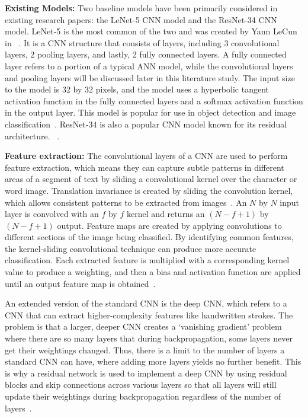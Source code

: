 \textbf{Existing Models:} Two baseline models have been primarily considered in existing research papers: the LeNet-5 CNN model and the ResNet-34 CNN model. LeNet-5 is the most common of the two and was created by Yann LeCun in ~\cite[Fig.~2]{lecun1998}. It is a CNN structure that consists of  layers, including 3 convolutional layers, 2 pooling layers, and lastly, 2 fully connected layers. A fully connected layer refers to a portion of a typical ANN model, while the convolutional layers and pooling layers will be discussed later in this literature study. The input size to the model is 32 by 32 pixels, and the model uses a hyperbolic tangent activation function in the fully connected layers and a softmax activation function in the output layer. This model is popular for use in object detection and image classification~\cite{chen2023}.
ResNet-34 is also a popular CNN model known for its residual architecture. ~\cite{ma2023}.

\textbf{Feature extraction:} The convolutional layers of a CNN are used to perform feature extraction, which means they can capture subtle patterns in different areas of a segment of text by sliding a convolutional kernel over the character or word image. Translation invariance is created by sliding the convolution kernel, which allows consistent patterns to be extracted from images~\cite{ma2023}. An $N$ by $N$ input layer is convolved with an $f$ by $f$ kernel and returns an $(N-f+1)$ by $(N-f+1)$ output. Feature maps are created by applying convolutions to different sections of the image being classified. By identifying common features, the kernel-sliding convolutional technique can produce more accurate classification. Each extracted feature is multiplied with a corresponding kernel value to produce a weighting, and then a bias and activation function are applied until an output feature map is obtained~\cite{yahya2021}.

An extended version of the standard CNN is the deep CNN, which refers to a CNN that can extract higher-complexity features like handwritten strokes. The problem is that a larger, deeper CNN creates a `vanishing gradient' problem where there are so many layers that during backpropagation, some layers never get their weightings changed. Thus, there is a limit to the number of layers a standard CNN can have, where adding more layers yields no further benefit. This is why a residual network is used to implement a deep CNN by using residual blocks and skip connections across various layers so that all layers will still update their weightings during backpropagation regardless of the number of layers~\cite{ma2023}.

